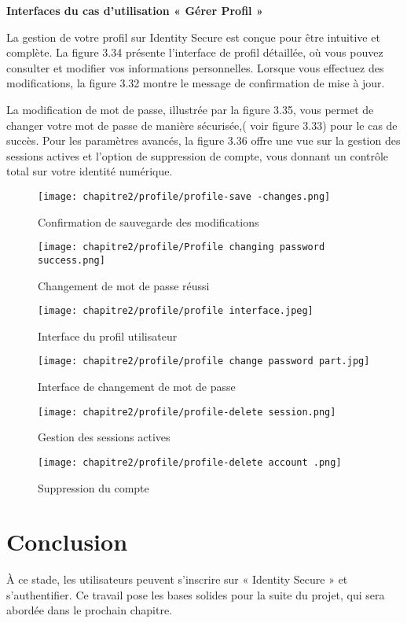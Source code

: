 \textbf{Interfaces du cas d'utilisation « Gérer Profil »}

La gestion de votre profil sur Identity Secure est conçue pour être intuitive et complète. La figure 3.34 présente l'interface de profil détaillée, où vous pouvez consulter et modifier vos informations personnelles. Lorsque vous effectuez des modifications, la figure 3.32 montre le message de confirmation de mise à jour.

La modification de mot de passe, illustrée par la figure 3.35, vous permet de changer votre mot de passe de manière sécurisée,( voir figure 3.33) pour le cas de succès. Pour les paramètres avancés, la figure 3.36 offre une vue sur la gestion des sessions actives et l'option de suppression de compte, vous donnant un contrôle total sur votre identité numérique.

\begin{figure}[H]
  \centering
  \begin{minipage}[t]{\textwidth}
    \centering
    \texttt{[image: chapitre2/profile/profile-save -changes.png]}
    \caption{Confirmation de sauvegarde des modifications}
    \vspace{0.3cm}
    \texttt{[image: chapitre2/profile/Profile changing password success.png]}
    \caption{Changement de mot de passe réussi}
  \end{minipage}

\end{figure}
\begin{figure}[H]
  \centering

  \begin{minipage}[t]{\textwidth}
    \centering
    \texttt{[image: chapitre2/profile/profile interface.jpeg]}
    \caption{Interface du profil utilisateur}
  \end{minipage}
\end{figure}
\begin{figure}[H]
  \centering
  \begin{minipage}[t]{\textwidth}
    \centering
    \texttt{[image: chapitre2/profile/profile change password part.jpg]}
    \caption{Interface de changement de mot de passe}

    \vspace{0.3cm}

    \texttt{[image: chapitre2/profile/profile-delete session.png]}
    \caption{Gestion des sessions actives}

    \vspace{0.3cm}

    \texttt{[image: chapitre2/profile/profile-delete account .png]}
    \caption{Suppression du compte}
  \end{minipage}

\end{figure}

\section*{Conclusion}
À ce stade, les utilisateurs peuvent s'inscrire sur « Identity Secure » et s'authentifier. Ce travail pose les bases solides pour la suite du projet, qui sera abordée dans le prochain chapitre.
\label{sec_Conclusion}